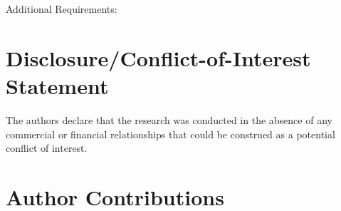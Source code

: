 \documentclass{frontiersSCNS} %
\begin{document}
Additional Requirements:

\section*{Disclosure/Conflict-of-Interest Statement}

The authors declare that the research was conducted in the absence of any commercial or financial relationships that could be construed as a potential conflict of interest.

\section*{Author Contributions}
\end{document}
